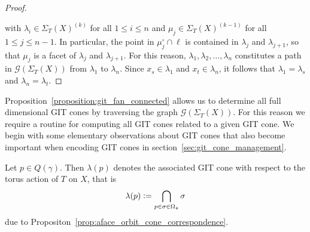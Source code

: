 \begin{proof}
\begin{center}
	\end{center}
	
	with $\lambda_i\in\Sigma_T(X)^{(k)}$ for all $1\leq i \leq n$ and $\mu_j\in\Sigma_T(X)^{(k-1)}$ for all $1\leq j \leq n-1$. In particular, the point in $\mu_j^\circ\cap \ell$ is contained in $\lambda_j$ and $\lambda_{j+1}$, so that $\mu_j$ is a facet of $\lambda_j$ and $\lambda_{j+1}$. For this reason, $\lambda_1,\lambda_2,\dots,\lambda_n$ constitutes a path in $\mathcal{G}(\Sigma_T(X))$ from $\lambda_1$ to $\lambda_n$. Since $x_s\in\lambda_1$ and $x_t\in\lambda_n$, it follows that $\lambda_1 = \lambda_s$ and $\lambda_n = \lambda_t$.
\end{proof}

Proposition~\ref{proposition:git_fan_connected} allows us to determine all full dimensional GIT cones by traversing the graph $\mathcal{G}(\Sigma_T(X))$. For this reason we require a routine for computing all GIT cones related to a given GIT cone. We begin with some elementary observations about GIT cones that also become important when encoding GIT cones in section~\ref{sec:git_cone_management}.

\begin{notation}
	Let $p\in Q(\gamma)$. Then $\lambda(p)$ denotes the associated GIT cone with respect to the torus action of $T$ on $X$, that is
	$$\lambda(p) \mathrel{\mathop:}= \bigcap_{p\in\sigma\in\Omega_{\mathfrak{a}}} \sigma$$
	due to Propositon~\ref{prop:aface_orbit_cone_correspondence}.
\end{notation}

